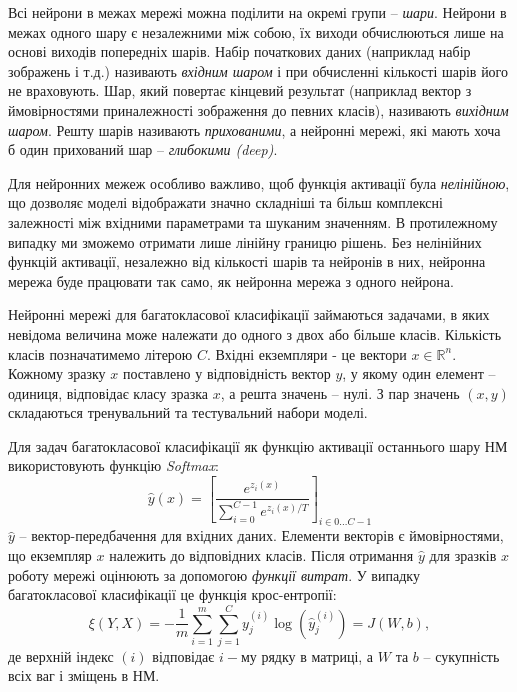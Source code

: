 \documentclass[14pt,a4paper]{extarticle}
\newcounter{e}
\numberwithin{equation}{section}
\numberwithin{figure}{section}
\begin{document}
 
 Всі нейрони в межах мережі можна поділити на окремі групи -- \textit{шари}. Нейрони в межах одного шару є незалежними між собою, їх виходи обчислюються лише на основі виходів попередніх шарів. Набір початкових даних (наприклад набір зображень і т.д.) називають \textit{вхідним шаром} і при обчисленні кількості шарів його не враховують. Шар, який повертає кінцевий результат (наприклад вектор з ймовірностями приналежності зображення до певних класів), називають \textit{вихідним шаром}. Решту шарів називають \textit{прихованими}, а нейронні мережі, які мають хоча б один прихований шар -- \textit{глибокими (deep)}.
 
 Для нейронних межеж особливо важливо, щоб функція активації була \textit{нелінійною}, що дозволяє моделі відображати значно складніші та більш комплексні залежності між вхідними параметрами та шуканим значенням. В протилежному випадку ми зможемо отримати лише лінійну границю рішень. Без нелінійних функцій активації, незалежно від кількості шарів та нейронів в них, нейронна мережа буде працювати так само, як нейронна мережа з одного нейрона.
 
 Нейронні мережі для багатокласової класифікації займаються задачами, в яких невідома величина може належати до одного з двох або більше класів. Кількість класів позначатимемо літерою $C$. Вхідні екземпляри - це вектори $x\in\mathbb{R}^n$. Кожному зразку $x$ поставлено у відповідність вектор $y$, у якому один елемент -- одиниця, відповідає класу зразка $x$, а решта значень -- нулі. З пар значень $(x, y)$ складаються тренувальний та тестувальний набори моделі.
 
 Для задач багатокласової класифікації як функцію активації останнього шару НМ використовують функцію \textit{Softmax}:
 \begin{equation}
	\label{softmax}
	\hat{y}(x)=\left[\frac{e^{z_{i}(x)}}{\sum\limits_{i=0}^{C-1} e^{z_{i}(x) / T}}\right]_{i \in 0 \dots C-1}
 \end{equation}
 $\hat{y}$ -- вектор-передбачення для вхідних даних. Елементи векторів є ймовірностями, що екземпляр $x$ належить до відповідних класів. Після отримання $\hat{y}$ для зразків $x$ роботу мережі оцінюють за допомогою \textit{функції витрат}. У випадку багатокласової класифікації це функція крос-ентропії:
 \begin{equation}
 \xi(Y, X)=-\frac{1}{m} \sum_{i=1}^{m} \sum_{j=1}^{C} y_{j}^{(i)} \log \left(\hat{y}_{j}^{(i)}\right)=J(W, b),
 \label{cost}
 \end{equation}
 де верхній індекс $(i)$ відповідає $i-$му рядку в матриці, а $W$ та $b$ -- сукупність всіх ваг і зміщень в НМ.
 
\end{document}
